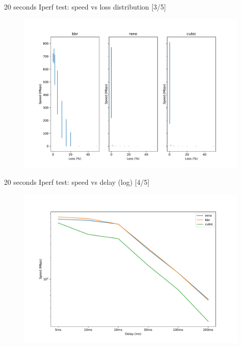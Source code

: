 \documentclass[13pt,aspectratio=43]{beamer}
\begin{document}
\begin{frame}{20 seconds Iperf test: speed vs loss distribution [3/5]}
  \begin{figure}
	  \includegraphics[width=\textwidth,height=\textheight,keepaspectratio]{../iperf_test/violinplot.pdf}
  \end{figure}
\end{frame}


\begin{frame}{20 seconds Iperf test: speed vs delay (log) [4/5]}
  \begin{figure}
	  \includegraphics[width=\textwidth,height=\textheight,keepaspectratio]{../iperf_test_delay/plot_log.pdf}
  \end{figure}
\end{frame}
\end{document}
